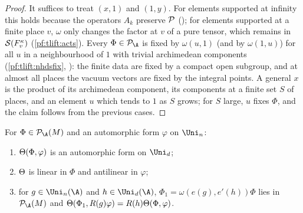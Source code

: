 \begin{proof}
It suffices to treat $(x,1)$ and $(1,y)$. For elements supported at infinity this holds because the operators $A_k$
preserve $\mathcal{P}$ (); for elements supported at a
finite place $v$, $\omega$ only changes the factor at $v$ of a pure tensor, which remains in $\mathcal{S}(F_v^\kappa)$
(\cref{pf:tlift:acts}). Every $\Phi\in\tliftPD$ is fixed by
$\omega(u,1)$ (and by $\omega(1,u)$) for all $u$ in a neighbourhood of $1$ with trivial archimedean components
(\cref{pf:tlift:nhdsfix}, ): the finite
data are fixed by a compact open subgroup, and at almost all places the vacuum vectors are fixed by the
integral points. A general $x$ is the product of its archimedean component, its components at a finite set $S$
of places, and an element $u$ which tends to $1$ as $S$ grows; for $S$ large, $u$ fixes $\Phi$, and the claim follows
from the previous cases.
\end{proof}

\begin{proposition}\label{pf:tlift:liftaut}
For $\Phi\in\tliftPD(M)$ and an automorphic form $\varphi$ on $\Uni_n$:
\begin{enumerate}[label=(\alph*),nosep]
\item $\Theta(\Phi,\varphi)$ is an automorphic form on $\Uni_d$;
\item $\Theta$ is linear in $\Phi$ and antilinear in $\varphi$;
\item for $g\in\Uni_n(\A)$ and $h\in\Uni_d(\A)$, $\Phi_1=\omega(e(g),e'(h))\Phi$ lies in $\tliftPD(M)$ and
  $\Theta(\Phi_1,R(g)\varphi)=R(h)\Theta(\Phi,\varphi)$.
\end{enumerate}
\end{proposition}

